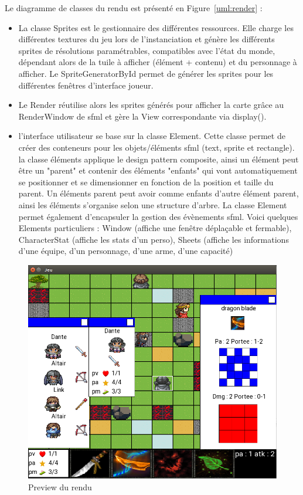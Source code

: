 \documentclass[a4paper,12pt]{article}
\begin{document}
Le diagramme de classes du rendu est présenté en Figure~\ref{uml:render} : 
\begin{itemize}
    \item La classe Sprites est le gestionnaire des différentes ressources. Elle charge les différentes textures du jeu lors de l'instanciation et génère les différents sprites de résolutions paramétrables, compatibles avec l'état du monde, dépendant alors de la tuile à afficher (élément + contenu) et du personnage à afficher. Le SpriteGeneratorById permet de générer les sprites pour les différentes fenêtres d'interface joueur.
    \item Le Render réutilise alors les sprites générés pour afficher la carte grâce au RenderWindow de sfml et gère la View correspondante via display().
    \item 
        l'interface utilisateur se base sur la classe Element. 
        Cette classe permet de créer des conteneurs pour les objets/éléments sfml (text, sprite et rectangle).
        la classe éléments applique le design pattern composite, ainsi un élément peut être un "parent" et contenir des éléments "enfants" qui vont automatiquement se positionner et se dimensionner en fonction de la position et taille du parent. 
        Un éléments parent peut avoir comme enfants d'autre élément parent, ainsi les éléments s'organise selon une structure d'arbre.
        La classe Element permet également d'encapsuler la gestion des évènements sfml.
        Voici quelques Elements particuliers : Window (affiche une fenêtre déplaçable et fermable), CharacterStat (affiche les stats d'un perso), Sheets (affiche les informations d'une équipe, d'un personnage, d'une arme, d'une capacité)
\end{itemize}

\begin{figure}[p]
    \centering
    \includegraphics[width=\textwidth]{render_preview.png}
    \caption{Preview du rendu}
\end{figure}
\end{document}
